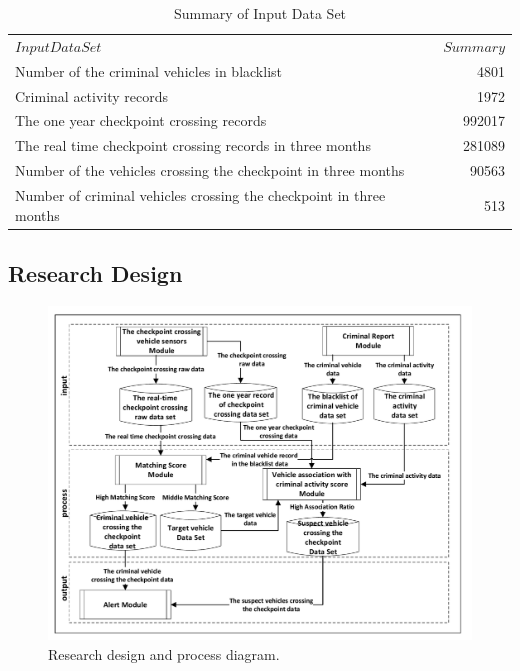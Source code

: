 \documentclass{llncs}
\begin{document}
\begin{table}
\caption{Summary of Input Data Set}
\label{table_inputData}
\begin{center}
\renewcommand{\arraystretch}{1.4}
\setlength\tabcolsep{3pt}
\begin{tabular}{lr}
\hline\noalign{\smallskip}
$Input Data Set$ & $Summary$\\
\noalign{\smallskip}
\hline
\noalign{\smallskip}
 Number of the criminal vehicles in blacklist & 4801 \\
Criminal activity records & 1972\\
The one year checkpoint crossing records & 992017\\
The real time checkpoint crossing records in three months & 281089\\
Number of the vehicles crossing the checkpoint in three months& 90563\\
Number of criminal vehicles crossing the checkpoint in three months& 513\\
\hline
\end{tabular}
\end{center}
\end{table}

\subsection{Research Design}
%
\begin{figure}
\centering
\vspace{1.8mm}
\includegraphics[width=1\textwidth]{images/myfigure.pdf}
\caption{Research design and process diagram.}
\label{fig:diagram}
\end{figure}
\end{document}
